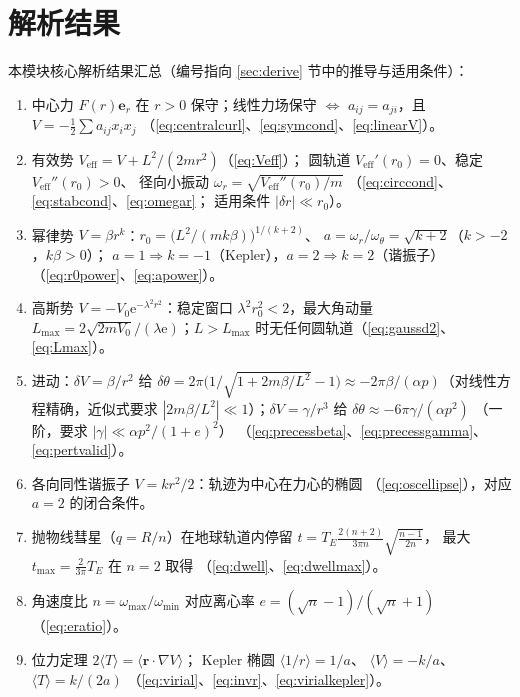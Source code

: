 \documentclass[UTF8,a4paper,11pt]{ctexart}
\begin{document}
\section{解析结果}
\label{sec:result}

本模块核心解析结果汇总（编号指向 \ref{sec:derive} 节中的推导与适用条件）：
\begin{enumerate}
  \item 中心力 $F(r)\boldsymbol{e}_r$ 在 $r>0$ 保守；线性力场保守
        $\Leftrightarrow$ $a_{ij}=a_{ji}$，且
        $V=-\frac12\sum a_{ij}x_ix_j$
        （\eqref{eq:centralcurl}、\eqref{eq:symcond}、\eqref{eq:linearV}）。
  \item 有效势 $V_{\mathrm{eff}}=V+L^2/(2mr^2)$（\eqref{eq:Veff}）；
        圆轨道 $V_{\mathrm{eff}}'(r_0)=0$、稳定 $V_{\mathrm{eff}}''(r_0)>0$、
        径向小振动 $\omega_r=\sqrt{V_{\mathrm{eff}}''(r_0)/m}$
        （\eqref{eq:circcond}、\eqref{eq:stabcond}、\eqref{eq:omegar}；
        适用条件 $|\delta r|\ll r_0$）。
  \item 幂律势 $V=\beta r^k$：$r_0=\bigl(L^2/(mk\beta)\bigr)^{1/(k+2)}$、
        $a=\omega_r/\omega_\theta=\sqrt{k+2}$（$k>-2$，$k\beta>0$）；
        $a=1\Rightarrow k=-1$（Kepler），$a=2\Rightarrow k=2$（谐振子）
        （\eqref{eq:r0power}、\eqref{eq:apower}）。
  \item 高斯势 $V=-V_0\mathrm{e}^{-\lambda^2r^2}$：稳定窗口
        $\lambda^2r_0^2<2$，最大角动量
        $L_{\max}=2\sqrt{2mV_0}/(\lambda\mathrm{e})$；$L>L_{\max}$
        时无任何圆轨道（\eqref{eq:gaussd2}、\eqref{eq:Lmax}）。
  \item 进动：$\delta V=\beta/r^2$ 给
        $\delta\theta=2\pi\bigl(1/\sqrt{1+2m\beta/L^2}-1\bigr)
        \approx-2\pi\beta/(\alpha p)$（对线性方程精确，近似式要求
        $|2m\beta/L^2|\ll1$）；$\delta V=\gamma/r^3$ 给
        $\delta\theta\approx-6\pi\gamma/(\alpha p^2)$
        （一阶，要求 $|\gamma|\ll\alpha p^2/(1+e)^2$）
        （\eqref{eq:precessbeta}、\eqref{eq:precessgamma}、\eqref{eq:pertvalid}）。
  \item 各向同性谐振子 $V=kr^2/2$：轨迹为中心在力心的椭圆
        （\eqref{eq:oscellipse}），对应 $a=2$ 的闭合条件。
  \item 抛物线彗星（$q=R/n$）在地球轨道内停留
        $t=T_E\frac{2(n+2)}{3\pi n}\sqrt{\frac{n-1}{2n}}$，
        最大 $t_{\max}=\frac{2}{3\pi}T_E$ 在 $n=2$ 取得
        （\eqref{eq:dwell}、\eqref{eq:dwellmax}）。
  \item 角速度比 $n=\omega_{\max}/\omega_{\min}$ 对应离心率
        $e=(\sqrt n-1)/(\sqrt n+1)$（\eqref{eq:eratio}）。
  \item 位力定理 $2\langle T\rangle=\langle\boldsymbol{r}\cdot\nabla V\rangle$；
        Kepler 椭圆 $\langle1/r\rangle=1/a$、
        $\langle V\rangle=-k/a$、$\langle T\rangle=k/(2a)$
        （\eqref{eq:virial}、\eqref{eq:invr}、\eqref{eq:virialkepler}）。
\end{enumerate}
\end{document}
